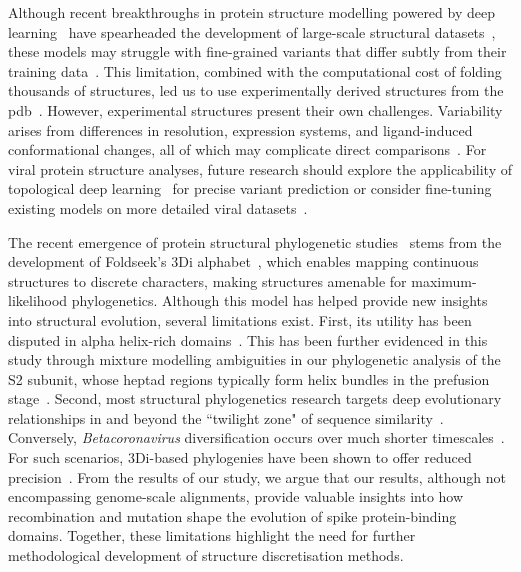 Although recent breakthroughs in protein structure modelling powered by deep learning~\cite{lin2023, jumper2021, abramson2024, mirdita2022} have spearheaded the development of large-scale structural datasets~\cite{varadi2022, kim2025b, vankempen2024}, these models may struggle with fine-grained variants that differ subtly from their training data~\cite{gomez2024}. This limitation, combined with the computational cost of folding thousands of structures, led us to use experimentally derived structures from the \gls{pdb}~\cite{berman2000, rose2010}. However, experimental structures present their own challenges. Variability arises from differences in resolution, expression systems, and ligand-induced conformational changes, all of which may complicate direct comparisons~\cite{pronker2023, hasse2024}. For viral protein structure analyses, future research should explore the applicability of topological deep learning~\cite{wee2025} for precise variant prediction or consider fine-tuning existing models on more detailed viral datasets~\cite{kim2025b}.


The recent emergence of protein structural phylogenetic studies~\cite{moi2023, puente2023, puente-lelievre2025, fullmer2025, garg2025, mutti2025, mifsud2024, mifsud2025} stems from the development of Foldseek's 3Di alphabet~\cite{vankempen2024}, which enables mapping continuous structures to discrete characters, making structures amenable for maximum-likelihood phylogenetics. Although this model has helped provide new insights into structural evolution, several limitations exist. First, its utility has been disputed in alpha helix-rich domains~\cite{fullmer2025}. This has been further evidenced in this study through mixture modelling ambiguities in our phylogenetic analysis of the S2 subunit, whose heptad regions typically form helix bundles in the prefusion stage~\cite{li2016, cai2020}. Second, most structural phylogenetics research targets deep evolutionary relationships in and beyond the ``twilight zone" of sequence similarity~\cite{rost1999}. Conversely, \textit{Betacoronavirus} diversification occurs over much shorter timescales~\cite{markov2023}. For such scenarios, 3Di-based phylogenies have been shown to offer reduced precision~\cite{puente2023, puente-lelievre2025}. From the results of our study, we argue that our results, although not encompassing genome-scale alignments, provide valuable insights into how recombination and mutation shape the evolution of spike protein-binding domains. Together, these limitations highlight the need for further methodological development of structure discretisation methods. 

